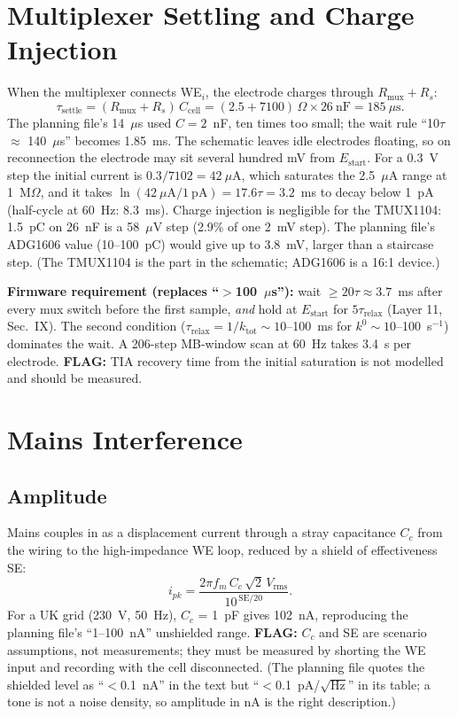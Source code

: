 \documentclass[10pt]{article}
\numberwithin{equation}{section}
\newcommand{\flag}[1]{\textbf{FLAG:} #1}
\begin{document}
\section{Multiplexer Settling and Charge Injection}
When the multiplexer connects WE$_i$, the electrode charges through $R_{\text{mux}} + R_s$:
\begin{equation}
\tau_{\text{settle}} = (R_{\text{mux}} + R_s)\,C_{\text{cell}} = (2.5 + 7100)\,\Omega \times 26~\text{nF} = 185~\mu\text{s}.
\end{equation}
The planning file's 14~$\mu$s used $C = 2$~nF, ten times too small; the wait rule ``10$\tau$ $\approx$ 140~$\mu$s'' becomes 1.85~ms. The
schematic leaves idle electrodes floating, so on reconnection the electrode may sit several hundred mV from $E_{\text{start}}$. For a
0.3~V step the initial current is $0.3/7102 = 42~\mu$A, which saturates the 2.5~$\mu$A range at 1~M$\Omega$, and it takes $\ln(42~\mu\text{A}/1~\text{pA}) = 17.6\tau = 3.2$~ms
to decay below 1~pA (half-cycle at 60~Hz: 8.3~ms). Charge injection is negligible for the TMUX1104: 1.5~pC on 26~nF is a 58~$\mu$V step (2.9\% of one 2~mV step). The planning file's ADG1606 value (10--100~pC) would give up to 3.8~mV, larger than a staircase step.
(The TMUX1104 is the part in the schematic; ADG1606 is a 16:1 device.)

\textbf{Firmware requirement (replaces ``$>$100~$\mu$s''):} wait $\ge 20\tau \approx 3.7$~ms after every mux switch before the first sample, \emph{and} hold at $E_{\text{start}}$ for
$5\tau_{\text{relax}}$ (Layer 11, Sec.~IX). The second condition ($\tau_{\text{relax}} = 1/k_{\text{tot}} \sim 10$--100~ms for $k^0 \sim 10$--100~s$^{-1}$) dominates the wait. A 206-step MB-window scan at 60~Hz takes 3.4~s per electrode.
\flag{TIA recovery time from the initial saturation is not modelled and should be measured.}

\section{Mains Interference}

\subsection{Amplitude}
Mains couples in as a displacement current through a stray capacitance $C_c$ from the wiring to the high-impedance WE loop, reduced by a shield of effectiveness SE:
\begin{equation}
i_{pk} = \frac{2\pi f_m\,C_c\,\sqrt{2}\,V_{\text{rms}}}{10^{\,\text{SE}/20}} .
\end{equation}
For a UK grid (230~V, 50~Hz), $C_c$ = 1~pF gives 102~nA, reproducing the planning file's ``1--100~nA'' unshielded range. \flag{$C_c$ and SE are scenario assumptions, not measurements;
they must be measured by shorting the WE input and recording with the cell disconnected.} (The planning file quotes the shielded level as ``$<$0.1~nA'' in the text but ``$<$0.1~pA/$\sqrt{\text{Hz}}$'' in its table; a tone is not a noise density, so amplitude in nA is the right description.)
\end{document}
